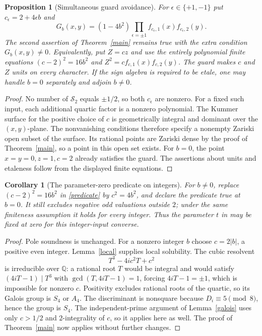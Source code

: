 \documentclass[11pt]{article}
\newtheorem{proposition}[theorem]{Proposition}
\newtheorem{corollary}[theorem]{Corollary}
\newcommand{\Q}{\mathbb Q}
\begin{document}
\begin{proposition}[Simultaneous guard avoidance]\label{guards}
For $\epsilon\in\{+1,-1\}$ put $c_\epsilon=2+4\epsilon b$ and
\[
 G_b(x,y)=(1-4b^2)\prod_{\epsilon=\pm1}
       f_{c_\epsilon,1}(x)f_{c_\epsilon,2}(y).
\]
The second assertion of Theorem~\ref{main} remains true with the extra
condition $G_b(x,y)\ne0$. Equivalently, put $Z=cz$ and use the entirely polynomial finite
equations $(c-2)^2=16b^2$ and
$Z^2=c f_{c,1}(x)f_{c,2}(y)$. The guard makes $c$ and $Z$ units on
every character. If the sign algebra is required
to be etale, one may handle $b=0$ separately and adjoin $b\ne0$.
\end{proposition}
\begin{proof}
No number of $\mathcal S_2$ equals $\pm1/2$, so both $c_\epsilon$ are
nonzero. For a fixed such input, each additional quartic factor is a
nonzero polynomial. The Kummer surface for the positive choice of $c$
is geometrically integral and dominant over the $(x,y)$-plane. The
nonvanishing conditions therefore specify a nonempty Zariski open
subset of the surface. Its rational points are Zariski dense by the
proof of Theorem~\ref{main}, so a point in this open set exists. For
$b=0$, the point $x=y=0,z=1,c=2$ already satisfies the guard.
The assertions about units and etaleness follow from the displayed
finite equations.
\end{proof}

\begin{corollary}[The parameter-zero predicate on integers]
For $b\ne0$, replace $(c-2)^2=16b^2$ in \eqref{predicate} by
$c^2=4b^2$, and declare the predicate true at $b=0$. It still excludes
negative odd valuations outside $2$; under the same finiteness
assumption it holds for every integer. Thus the parameter $t$ in
\cite[Section~4]{KPV} may be fixed at zero for this integer-input
converse.
\end{corollary}
\begin{proof}
Pole soundness is unchanged. For a nonzero integer $b$ choose
$c=2|b|$, a positive even integer. Lemma~\ref{local} supplies local
solubility. The cubic resolvent
\[
 T^3-4ic^2T+c^2
\]
is irreducible over $\Q$: a rational root $T$ would be integral and
would satisfy $(4iT-1)\mid T^3$ with
$\gcd(T,4iT-1)=1$, forcing $4iT-1=\pm1$, which is impossible for
nonzero $c$. Positivity excludes rational roots of the quartic, so
its Galois group is $S_4$ or $A_4$. The discriminant is nonsquare
because $D_i\equiv5\pmod8$, hence the group is $S_4$. The
independent-prime argument of Lemma~\ref{galois} uses only $c>1/2$
and $2$-integrality of $c$, so it applies here as well. The proof of
Theorem~\ref{main} now applies without further changes.
\end{proof}
\end{document}
